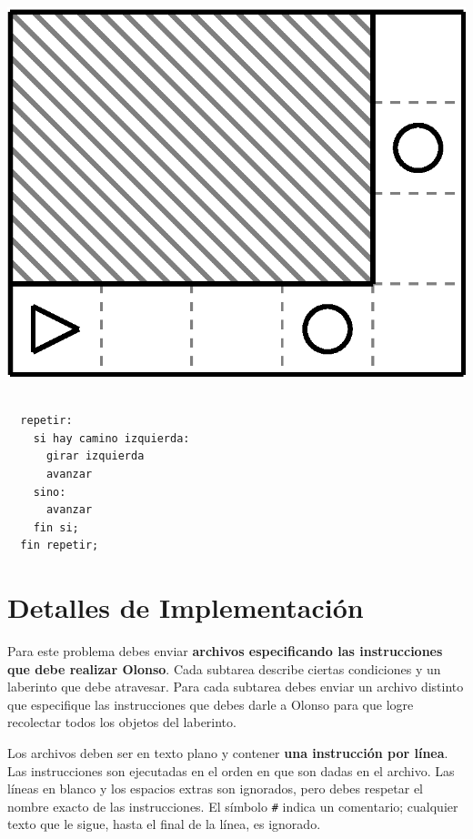 \documentclass{oci}
\def\bgcolor{\par\setbox0\vbox\bgroup}
\def\endbgcolor{\egroup\fboxsep0pt \noindent\colorbox[gray]{0.95}{\usebox0}\par}
\begin{document}
\begin{problemDescription}
\begin{minipage}{0.5\linewidth}
  \centering
  \includegraphics[scale=0.45]{laberintos/ejemplo3.eps}
\end{minipage}
\begin{minipage}{0.5\linewidth}
  \centering
  \bgcolor{}
\begin{verbatim}

  repetir:
    si hay camino izquierda:
      girar izquierda
      avanzar
    sino:
      avanzar
    fin si;
  fin repetir;
\end{verbatim}
  \endbgcolor{}
\end{minipage}

\end{problemDescription}

\section*{Detalles de Implementación}
Para este problema debes enviar {\bf archivos especificando las instrucciones que debe realizar Olonso}.
Cada subtarea describe ciertas condiciones y un laberinto que debe atravesar.
Para cada subtarea debes enviar un archivo distinto que especifique las instrucciones que debes darle a Olonso para que logre recolectar todos los objetos del laberinto.

Los archivos deben ser en texto plano y contener {\bf una instrucción por línea}.
Las instrucciones son ejecutadas en el orden en que son dadas en el archivo.
Las líneas en blanco y los espacios extras son ignorados, pero debes respetar el nombre exacto de las instrucciones.
El símbolo \verb~#~ indica un comentario; cualquier texto que le sigue, hasta el final de la línea, es ignorado.
\end{document}
